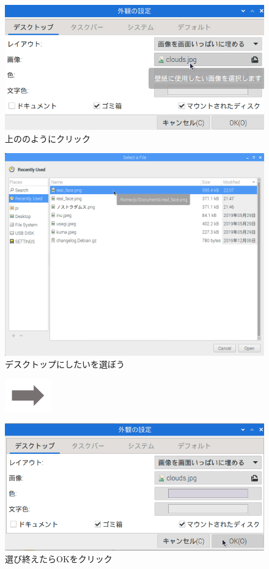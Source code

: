 \begin{figure}
\begin{minipage}{0.4\textwidth}
    \includegraphics[width=\linewidth]{text01-img/textbook-img108.png}
     上ののようにクリック
  \end{minipage}

  \begin{minipage}{0.4\textwidth}
    \includegraphics[width=\linewidth]{text01-img/textbook-img110.png}
     デスクトップにしたいを選ぼう
  \end{minipage}
  \includegraphics[width=2cm]{text01-img/textbook-img073.png}
  \begin{minipage}{0.4\textwidth}
    \includegraphics[width=\linewidth]{text01-img/textbook-img109.png}
     選び終えたらOKをクリック
  \end{minipage}


\end{figure}
